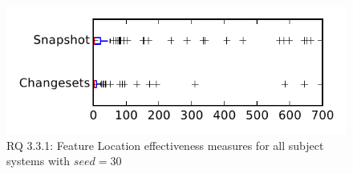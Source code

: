 
\begin{figure}
\centering
\includegraphics[height=0.4\textheight]{figures/flt_seed/rq1_tiny_30}
\caption{RQ 3.3.1: Feature Location effectiveness measures for all subject systems with $seed=30$}
\label{fig:flt_seed:rq1:tiny}
\end{figure}

